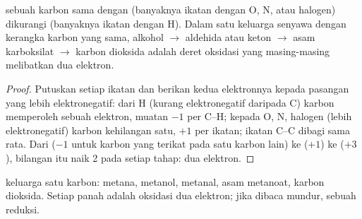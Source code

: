 \begin{proposition}\label{prop:b1:organic-redox:on-of-carbon}
 sebuah karbon sama dengan (banyaknya ikatan dengan O, N,
atau halogen) dikurangi (banyaknya ikatan dengan H). Dalam satu keluarga
senyawa dengan kerangka karbon yang sama, alkohol $\to$ aldehida atau
keton $\to$ asam karboksilat $\to$ karbon dioksida adalah deret oksidasi
yang masing-masing melibatkan dua elektron.
\end{proposition}

\begin{proof}
Putuskan setiap ikatan dan berikan kedua elektronnya kepada pasangan yang
lebih elektronegatif: dari H (kurang elektronegatif daripada C) karbon
memperoleh sebuah elektron, muatan $-1$ per C--H; kepada O, N, halogen
(lebih elektronegatif) karbon kehilangan satu, $+1$ per ikatan; ikatan
C--C dibagi sama rata. Dari  ($-1$ untuk karbon yang terikat
pada satu karbon lain) ke  ($+1$) ke  ($+3$), bilangan
itu naik 2 pada setiap tahap: dua elektron.
\end{proof}

\begin{omfigure}

{\small {} keluarga satu karbon: metana, metanol, metanal,
asam metanoat, karbon dioksida. Setiap panah adalah oksidasi dua elektron;
jika dibaca mundur, sebuah reduksi.}
\end{omfigure}

